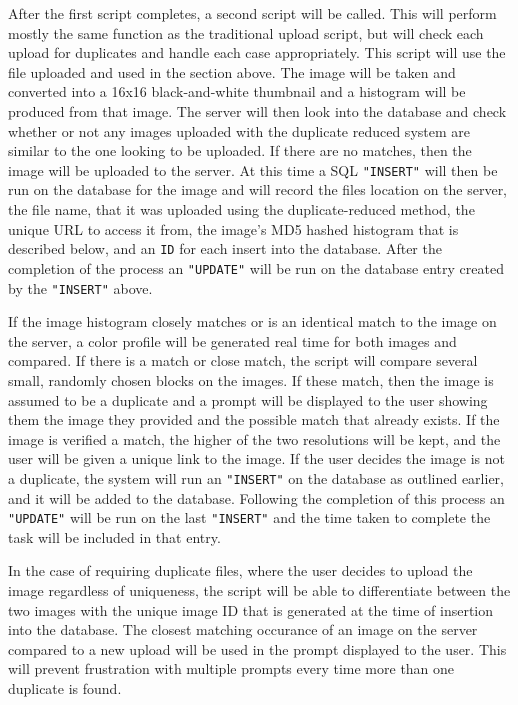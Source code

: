 \documentclass[11pt]{article}
\begin{document}
After the first script completes, a second script will be called. This will perform mostly the same function as the traditional upload script, but will check each upload for duplicates and handle each case appropriately. This script will use the file uploaded and used in the section above. The image will be taken and converted into a 16x16 black-and-white thumbnail and a histogram will be produced from that image. The server will then look into the database and check whether or not any images uploaded with the duplicate reduced system are similar to the one looking to be uploaded. If there are no matches, then the image will be uploaded to the server. At this time a SQL {\tt "INSERT"} will then be run on the database for the image and will record the files location on the server, the file name, that it was uploaded using the duplicate-reduced method, the unique URL to access it from, the image's MD5 hashed histogram that is described below, and an {\tt ID} for each insert into the database. After the completion of the process an {\tt "UPDATE"} will be run on the database entry created by the {\tt "INSERT"} above.

If the image histogram closely matches or is an identical match to the image on the server, a color profile will be generated real time for both images and compared. If there is a match or close match, the script will compare several small, randomly chosen blocks on the images. If these match, then the image is assumed to be a  duplicate and a prompt will be displayed to the user showing them the image they provided and the possible match that already exists. If the image is verified a match, the higher of the two resolutions will be kept, and the user will be given a unique link to the image. If the user decides the image is not a duplicate, the system will run an {\tt "INSERT"} on the database as outlined earlier, and it will be added to the database. Following the completion of this process an {\tt "UPDATE"} will be run on the last {\tt "INSERT"} and the time taken to complete the task will be included in that entry.

In the case of requiring duplicate files, where the user decides to upload the image regardless of uniqueness, the script will be able to differentiate between the two images with the unique image ID that is generated at the time of insertion into the database. The closest matching occurance of an image on the server compared to a new upload will be used in the prompt displayed to the user. This will prevent frustration with multiple prompts every time more than one duplicate is found.
\end{document}
